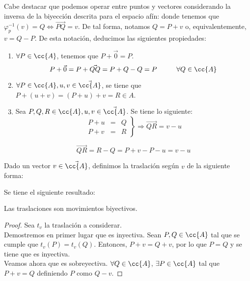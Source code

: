 Cabe destacar que podemos operar entre puntos y vectores considerando la inversa de la biyección descrita para el espacio afín:
donde tenemos que $\varphi_p^{-1}(v)=Q\Longleftrightarrow \vec{PQ}=v$. De tal forma, notamos $Q=P+v$ o, equivalentemente, $v=Q-P$. De esta notación, deducimos las siguientes propiedades:
\begin{enumerate}
    \item $\forall P\in \cc{A}$, tenemos que $P+\vec{0}=P$.
    \begin{equation*}
        P+\vec{0} = P+\vec{QQ} = P+Q-Q=P \hspace{1cm} \forall Q\in \cc{A}
    \end{equation*}
    \item $\forall P\in \cc{A}, u,v\in \vec{\cc{A}}$, se tiene que $P+(u+v)=(P+u)+v=R\in A$.
    \item Sea $P,Q,R\in \cc{A}, u,v\in \vec{\cc{A}}$. Se tiene lo siguiente:
    \begin{equation*}
        \left.\begin{array}{rcl}
            P+u & = & Q  \\
            P+v & = & R
        \end{array}\right\} \Longrightarrow \vec{QR}=v-u
    \end{equation*}

    \begin{equation*}
        \vec{QR} = R-Q = P+v-P-u = v-u
    \end{equation*}
\end{enumerate}


\begin{definicion}[Traslación]\label{def:traslacion}
    Dado un vector $v\in \vec{\cc{A}}$, definimos la traslación según $v$ de la siguiente forma:
\end{definicion}

Se tiene el siguiente resultado:
\begin{prop}
    Las traslaciones son movimientos biyectivos.
\end{prop}
\begin{proof}
    Sea $t_v$ la traslación a considerar.\\
    
    Demostremos en primer lugar que es inyectiva. Sean $P,Q\in \cc{A}$ tal que se cumple que $t_v(P)=t_v(Q)$. Entonces, $P+v=Q+v$, por lo que $P=Q$ y se tiene que es inyectiva.\\

    Veamos ahora que es sobreyectiva. $\forall Q\in \cc{A}$, $\exists P\in \cc{A}$ tal que $P+v=Q$ definiendo $P$ como $Q-v$.
\end{proof}

